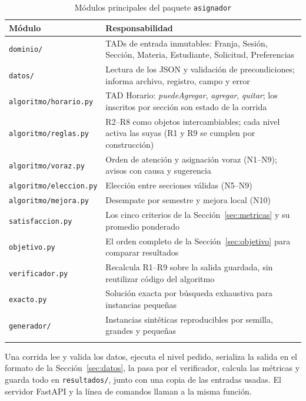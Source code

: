 \begin{table}[htbp]
\caption{Módulos principales del paquete \texttt{asignador}}\label{tab:modulos}
\small
\begin{tabularx}{\textwidth}{@{}lL@{}}
\toprule
Módulo & Responsabilidad \\
\midrule
\texttt{dominio/} & TADs de entrada inmutables: Franja, Sesión, Sección, Materia, Estudiante, Solicitud, Preferencias \\
\texttt{datos/} & Lectura de los JSON y validación de precondiciones; informa archivo, registro, campo y error \\
\texttt{algoritmo/horario.py} & TAD Horario: \emph{puedeAgregar}, \emph{agregar}, \emph{quitar}; los inscritos por sección son estado de la corrida \\
\texttt{algoritmo/reglas.py} & R2--R8 como objetos intercambiables; cada nivel activa las suyas (R1 y R9 se cumplen por construcción) \\
\texttt{algoritmo/voraz.py} & Orden de atención y asignación voraz (N1--N9); avisos con causa y sugerencia \\
\texttt{algoritmo/eleccion.py} & Elección entre secciones válidas (N5--N9) \\
\texttt{algoritmo/mejora.py} & Desempate por semestre y mejora local (N10) \\
\texttt{satisfaccion.py} & Los cinco criterios de la Sección~\ref{sec:metricas} y su promedio ponderado \\
\texttt{objetivo.py} & El orden completo de la Sección~\ref{sec:objetivo} para comparar resultados \\
\texttt{verificador.py} & Recalcula R1--R9 sobre la salida guardada, sin reutilizar código del algoritmo \\
\texttt{exacto.py} & Solución exacta por búsqueda exhaustiva para instancias pequeñas \\
\texttt{generador/} & Instancias sintéticas reproducibles por semilla, grandes y pequeñas \\
\botrule
\end{tabularx}
\end{table}

Una corrida lee y valida los datos, ejecuta el nivel pedido, serializa la salida en el formato de la Sección~\ref{sec:datos}, la pasa por el verificador, calcula las métricas y guarda todo en \texttt{resultados/}, junto con una copia de las entradas usadas. El servidor FastAPI y la línea de comandos llaman a la misma función.

